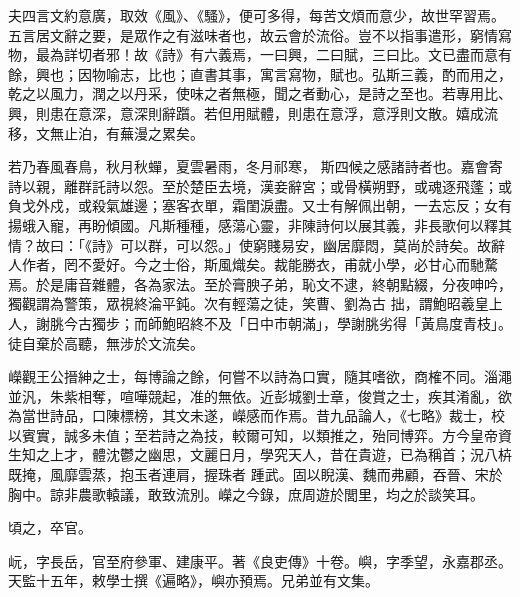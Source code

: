 \begin{pinyinscope}
 夫四言文約意廣，取效《風》、《騷》，便可多得，每苦文煩而意少，故世罕習焉。五言居文辭之要，是眾作之有滋味者也，故云會於流俗。豈不以指事遣形，窮情寫物，最為詳切者邪！故《詩》有六義焉，一曰興，二曰賦，三曰比。文已盡而意有餘，興也；因物喻志，比也；直書其事，寓言寫物，賦也。弘斯三義，酌而用之，乾之以風力，潤之以丹采，使味之者無極，聞之者動心，是詩之至也。若專用比、興，則患在意深，意深則辭躓。若但用賦體，則患在意浮，意浮則文散。嬉成流移，文無止泊，有蕪漫之累矣。



 若乃春風春鳥，秋月秋蟬，夏雲暑雨，冬月祁寒，
 斯四候之感諸詩者也。嘉會寄詩以親，離群託詩以怨。至於楚臣去境，漢妾辭宮；或骨橫朔野，或魂逐飛蓬；或負戈外戍，或殺氣雄邊；塞客衣單，霜閨淚盡。又士有解佩出朝，一去忘反；女有揚蛾入寵，再盼傾國。凡斯種種，感蕩心靈，非陳詩何以展其義，非長歌何以釋其情？故曰：「《詩》可以群，可以怨。」使窮賤易安，幽居靡悶，莫尚於詩矣。故辭人作者，罔不愛好。今之士俗，斯風熾矣。裁能勝衣，甫就小學，必甘心而馳騖焉。於是庸音雜體，各為家法。至於膏腴子弟，恥文不逮，終朝點綴，分夜呻吟，獨觀謂為警策，眾視終淪平鈍。次有輕蕩之徒，笑曹、劉為古
 拙，謂鮑昭羲皇上人，謝朓今古獨步；而師鮑昭終不及「日中市朝滿」，學謝朓劣得「黃鳥度青枝」。徒自棄於高聽，無涉於文流矣。



 嶸觀王公搢紳之士，每博論之餘，何嘗不以詩為口實，隨其嗜欲，商榷不同。淄澠並汎，朱紫相奪，喧嘩競起，准的無依。近彭城劉士章，俊賞之士，疾其淆亂，欲為當世詩品，口陳標榜，其文未遂，嶸感而作焉。昔九品論人，《七略》裁士，校以賓實，誠多未值；至若詩之為技，較爾可知，以類推之，殆同博弈。方今皇帝資生知之上才，體沈鬱之幽思，文麗日月，學究天人，昔在貴遊，已為稱首；況八枿既掩，風靡雲蒸，抱玉者連肩，握珠者
 踵武。固以睨漢、魏而弗顧，吞晉、宋於胸中。諒非農歌轅議，敢致流別。嶸之今錄，庶周遊於閭里，均之於談笑耳。



 頃之，卒官。



 岏，字長岳，官至府參軍、建康平。著《良吏傳》十卷。嶼，字季望，永嘉郡丞。天監十五年，敕學士撰《遍略》，嶼亦預焉。兄弟並有文集。




\end{pinyinscope}
